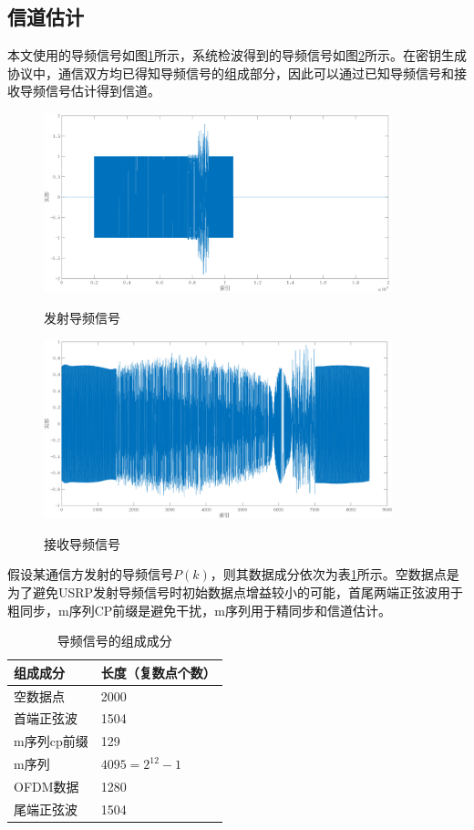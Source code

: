 \documentclass[master]{seuthesis} %
\begin{document}
\begin{Main}
\section{信道估计}

本文使用的导频信号如图\ref{tx_pilot}所示，系统检波得到的导频信号如图\ref{rx_pilot}所示。在密钥生成协议中，通信双方均已得知导频信号的组成部分，因此可以通过已知导频信号和接收导频信号估计得到信道。

\begin{figure}
    \centering
    \includegraphics[width=0.9\textwidth]{images/tx_pilot}
    \caption{发射导频信号}{} 
    \label{tx_pilot}
\end{figure}

\begin{figure}
    \centering
    \includegraphics[width=0.9\textwidth]{images/rx_pilot}
    \caption{接收导频信号}{} 
    \label{rx_pilot}
\end{figure}

假设某通信方发射的导频信号$P(k)$，则其数据成分依次为表\ref{component_of_pilot}所示。空数据点是为了避免USRP发射导频信号时初始数据点增益较小的可能，首尾两端正弦波用于粗同步，m序列CP前缀是避免干扰，m序列用于精同步和信道估计。

\begin{table}[]
    \centering
    \begin{tabular}{|l|l|}
    \hline
    组成成分 & 长度（复数点个数）\\ \hline
    空数据点 & 2000 \\ \hline
    首端正弦波 & 1504 \\ \hline
    m序列cp前缀 & 129 \\ \hline
    m序列 & $ 4095 = 2^{12} - 1 $ \\ \hline
    OFDM数据 & 1280 \\ \hline
    尾端正弦波 & 1504 \\ \hline
    \end{tabular}
    \caption{导频信号的组成成分
    \label{component_of_pilot}}
\end{table}


\end{Main}
\end{document}

